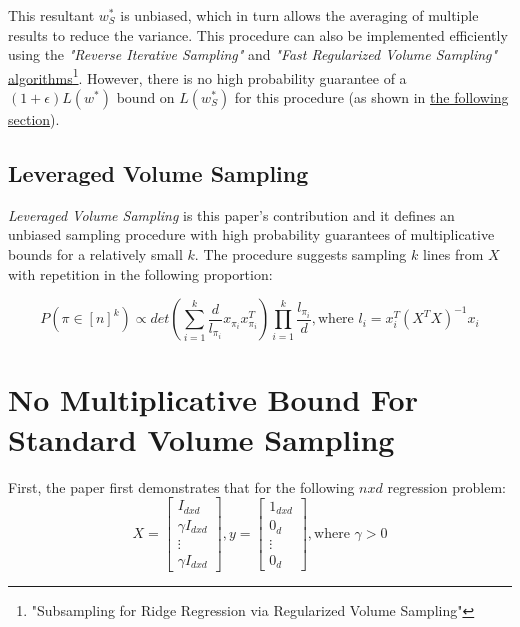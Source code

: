 \documentclass{article}
\begin{document}
            This resultant $w_{S}^\ast$ is unbiased, which in turn allows the averaging of multiple results to reduce the variance.
            This procedure can also be implemented efficiently using the \textit{"Reverse Iterative Sampling"} and \textit{"Fast Regularized
            Volume Sampling"} {\color{blue}\href{https://arxiv.org/abs/1710.05110}{\underline{algorithms}}}\footnote{\label{reg_vol_samp}"Subsampling
            for Ridge Regression via Regularized Volume Sampling"}.
            However, there is no high probability guarantee of a $(1+\epsilon)L(w^\ast)$ bound on $L(w_{S}^\ast)$ for this procedure
            (as shown in \hyperref[sec:no_mult_bound_vol]{the following section}).

        \subsection{Leveraged Volume Sampling}
            \textit{Leveraged Volume Sampling} is this paper's contribution and it defines an unbiased sampling procedure with high probability
            guarantees of multiplicative bounds for a relatively small $k$.
            The procedure suggests sampling $k$ lines from $X$ with repetition in the following proportion:

            \begin{equation}
                P(\pi\in{[n]^k}) \propto det(\sum_{i=1}^{k}\frac{d}{l_{\pi_{i}}}x_{\pi_{i}}x_{\pi_{i}}^T)\prod_{i=1}^{k}\frac{l_{\pi_{i}}}{d}, \text{where } l_{i}=x_{i}^T(X^TX)^{-1}x_{i}
            \end{equation}

    \section{No Multiplicative Bound For Standard Volume Sampling}
        \label{sec:no_mult_bound_vol}
        First, the paper first demonstrates that for the following $n x d$ regression problem:
        \begin{equation*}
            X=
                \begin{bmatrix}
                    I_{dxd} \\
                    \gamma I_{dxd} \\
                    \vdots \\
                    \gamma I_{dxd}
                \end{bmatrix}
            , y=
                \begin{bmatrix}
                    1_{dxd} \\
                    0_{d} \\
                    \vdots \\
                    0_{d}
                \end{bmatrix}
            , \text{where } \gamma > 0
        \end{equation*}
\end{document}
